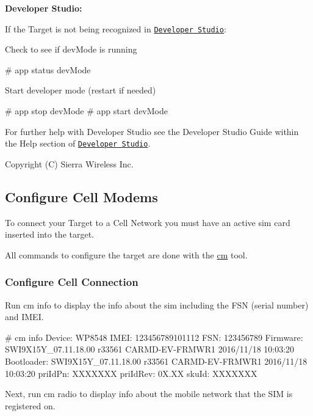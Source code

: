 {\bfseries Developer Studio\+:}

If the Target is not being recognized in \href{https://source.sierrawireless.com/resources/airprime/software/developer-studio-installinstructions}{\tt Developer Studio}\+:

Check to see if {\ttfamily dev\+Mode} is running

\begin{DoxyVerb}# app status devMode
\end{DoxyVerb}


Start developer mode (restart if needed)

\begin{DoxyVerb}# app stop devMode
# app start devMode
\end{DoxyVerb}


For further help with Developer Studio see the Developer Studio Guide within the Help section of \href{https://source.sierrawireless.com/resources/airprime/software/developer-studio-installinstructions}{\tt Developer Studio}.

Copyright (C) Sierra Wireless Inc. \hypertarget{basicTargetModem}{}\subsection{Configure Cell Modems}\label{basicTargetModem}
To connect your Target to a Cell Network you must have an active sim card inserted into the target.

All commands to configure the target are done with the \hyperlink{toolsTarget_cm}{cm} tool.\hypertarget{basicTargetModem_targetModemConf}{}\subsubsection{Configure Cell Connection}\label{basicTargetModem_targetModemConf}
Run {\ttfamily cm} {\ttfamily info} to display the info about the sim including the F\+SN (serial number) and I\+M\+EI.

\begin{DoxyVerb}# cm info
Device:     WP8548
IMEI:       123456789101112
FSN:        123456789
Firmware:   SWI9X15Y_07.11.18.00 r33561 CARMD-EV-FRMWR1 2016/11/18 10:03:20
Bootloader: SWI9X15Y_07.11.18.00 r33561 CARMD-EV-FRMWR1 2016/11/18 10:03:20
priIdPn:    XXXXXXX
priIdRev:   0X.XX
skuId:      XXXXXXX
\end{DoxyVerb}


Next, run {\ttfamily cm} {\ttfamily radio} to display info about the mobile network that the S\+IM is registered on.

